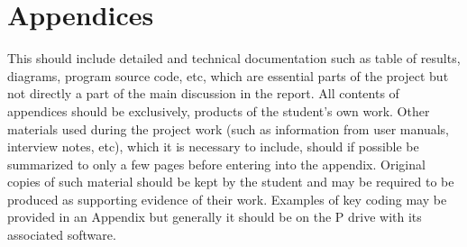 \documentclass{report} %
\begin{document}
\chapter{Appendices}
This should include detailed and technical documentation such as table of results, diagrams, program source code, etc, which are essential parts of the project but not directly a part of the main discussion in the report.  All contents of appendices should be exclusively, products of the student’s own work.
Other materials used during the project work (such as information from user manuals, interview notes, etc), which it is necessary to include, should if possible be summarized to only a few pages before entering into the appendix. Original copies of such material should be kept by the student and may be required to be produced as supporting evidence of their work.  Examples of key coding may be provided in an Appendix but generally it should be on the P drive with its associated software.
\end{document}
